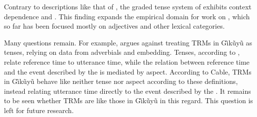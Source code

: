 \documentclass[output=paper,
modfonts
]{langscibook}
\begin{document}
Contrary to descriptions like that of \citet{ashton54luganda}, the graded tense system of  exhibits context dependence and .
This finding expands the empirical domain for work on , which so far has been focused mostly on adjectives and other lexical categories. 

Many questions remain.
For example, \citet{cable12beyond} argues against treating TRMs in G\~\i k\~uy\~u as tenses, relying on data from adverbials and embedding. 
Tenses, according to \citet{klein94time}, relate reference time to utterance time, while the relation between reference time and the event described by the  is mediated by aspect.
According to Cable, TRMs in G\~\i k\~uy\~u behave like neither tense nor aspect according to these definitions, instead relating utterance time directly to the event described by the .
It remains to be seen whether  TRMs are like those in G\~\i k\~uy\~u in this regard.
This question is left for future research.

%
%

%
%
%
%
%
%
%
\end{document}
